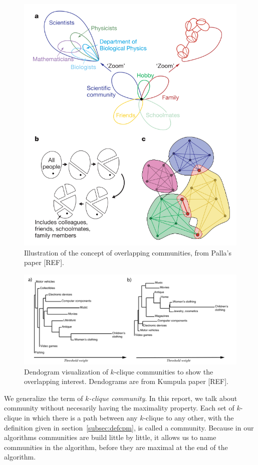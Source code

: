 \begin{figure}[h]
  \centering
  \includegraphics[scale=0.45]{Contents/commusPalla}
  \caption{Illustration of the concept of overlapping communities, from Palla's paper [REF].}
  \label{fig:palla}
\end{figure}

\begin{figure}[h]
  \centering
  \includegraphics[scale=0.35]{Contents/commusKumpula}
  \caption{Dendogram visualization of $k$-clique communities to show the overlapping interest. Dendograms are from Kumpula paper [REF].}
  \label{fig:kumpula}
\end{figure}

We generalize the term of \emph{$k$-clique community}. In this report, we talk about community without necesarily having the maximality property. Each set of $k$-clique in which there is a path between any $k$-clique to any other, with the definition given in section~\ref{subsec:defcpm}, is called a community. Because in our algorithms communities are build little by little, it allows us to name communities in the algorithm, before they are maximal at the end of the algorithm.



